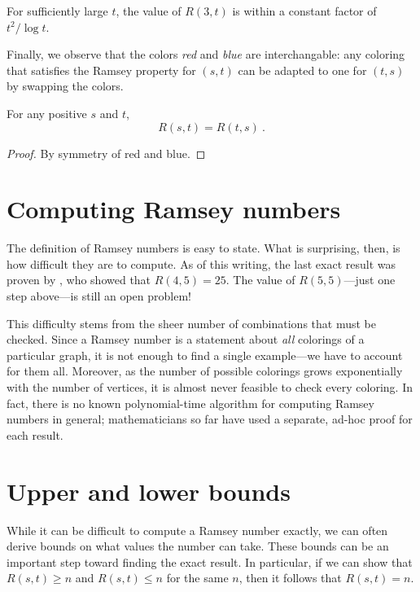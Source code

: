 \documentclass{article}
\begin{document}
\begin{Theorem} \label{kims_theorem}
    For sufficiently large $t$, the value of $R(3,t)$ is within a constant factor of $t^2/\log t$.
\end{Theorem}

Finally, we observe that the colors \emph{red} and \emph{blue} are interchangable: any coloring that satisfies the Ramsey property for $(s,t)$ can be adapted to one for $(t,s)$ by swapping the colors.

\begin{Proposition}
    For any positive $s$ and $t$,
    \[ R(s,t) = R(t,s) \ . \]
\end{Proposition}

\begin{proof}
    By symmetry of red and blue.
\end{proof}

\section{Computing Ramsey numbers}

The definition of Ramsey numbers is easy to state. What is surprising, then, is how difficult they are to compute. As of this writing, the last exact result was proven by \cite{JGT:JGT3190190304}, who showed that $R(4,5) = 25$. The value of $R(5,5)$---just one step above---is still an open problem!


This difficulty stems from the sheer number of combinations that must be checked. Since a Ramsey number is a statement about \emph{all} colorings of a particular graph, it is not enough to find a single example---we have to account for them all. Moreover, as the number of possible colorings grows exponentially with the number of vertices, it is almost never feasible to check every coloring. In fact, there is no known polynomial-time algorithm for computing Ramsey numbers in general; mathematicians so far have used a separate, ad-hoc proof for each result.

\section{Upper and lower bounds}

While it can be difficult to compute a Ramsey number exactly, we can often derive bounds on what values the number can take. These bounds can be an important step toward finding the exact result. In particular, if we can show that $R(s,t) \geq n$ and $R(s,t) \leq n$ for the same $n$, then it follows that $R(s,t) = n$.
\end{document}
